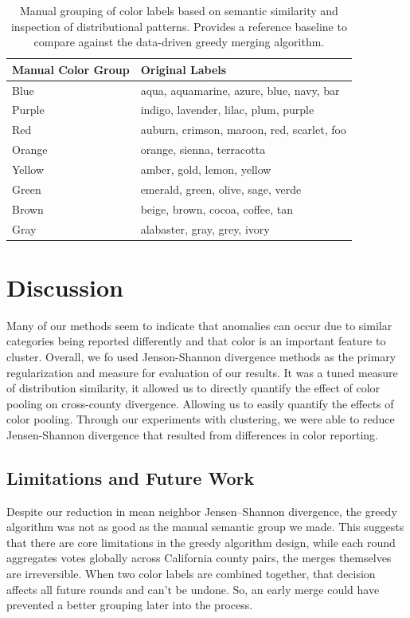 \documentclass[11pt,letterpaper]{article}
\begin{document}
\begin{table}[H]
\centering
\begin{tabular}{ll}
\hline
\textbf{Manual Color Group} & \textbf{Original Labels} \\
\hline
Blue   & aqua, aquamarine, azure, blue, navy, bar \\
Purple & indigo, lavender, lilac, plum, purple \\
Red    & auburn, crimson, maroon, red, scarlet, foo \\
Orange & orange, sienna, terracotta \\
Yellow & amber, gold, lemon, yellow \\
Green  & emerald, green, olive, sage, verde \\
Brown  & beige, brown, cocoa, coffee, tan \\
Gray   & alabaster, gray, grey, ivory \\
\hline
\end{tabular}
\caption{Manual grouping of color labels based on semantic similarity and inspection of distributional patterns. Provides a reference baseline to compare against the data-driven greedy merging algorithm.}
\end{table}

\section{Discussion}

Many of our methods seem to indicate that anomalies can occur due to similar categories being reported differently and that color is an important feature to cluster. Overall, we fo used Jenson-Shannon divergence methods as the primary regularization and measure for evaluation of our results. It was a tuned measure of distribution similarity, it allowed us to directly quantify the effect of color pooling on cross-county divergence. Allowing us to easily quantify the effects of color pooling. Through our experiments with clustering, we were able to reduce Jensen-Shannon divergence that resulted from differences in color reporting. 

\subsection{Limitations and Future Work} \label{Future Work}

Despite our reduction in mean neighbor Jensen–Shannon divergence, the greedy algorithm was not as good as the manual semantic group we made. This suggests that there are core limitations in the greedy algorithm design, while each round aggregates votes globally across California county pairs, the merges themselves are irreversible. When two color labels are combined together, that decision affects all future rounds and can't be undone. So, an early merge could have prevented a better grouping later into the process.
\end{document}
